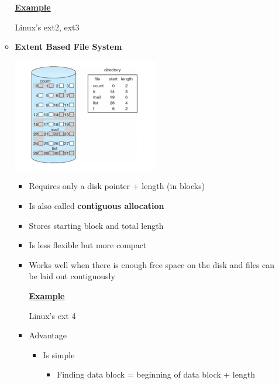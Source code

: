 \documentclass[12pt]{article}
\begin{document}
\begin{enumerate}[1.]
\begin{itemize}
        \bigskip

        \underline{\textbf{Example}}

        \bigskip

        Linux's ext2, ext3

        \item \textbf{Extent Based File System}

        \begin{center}
        \includegraphics[width=0.7\linewidth]{../images/midterm_4_solution_28.png}
        \end{center}

        \begin{itemize}
            \item Requires only a disk pointer + length (in blocks)
            \item Is also called \textbf{contiguous allocation}
            \item Stores starting block and total length
            \item Is less flexible but more compact
            \item Works well when there is enough free space on the disk and files can be laid out contiguously

            \bigskip

            \underline{\textbf{Example}}

            \bigskip

            Linux's ext 4

            \item Advantage

            \begin{itemize}
                \item Is simple

                \begin{itemize}
                    \item Finding data block = beginning of data block + length
                \end{itemize}
            \end{itemize}


\end{itemize}
\end{itemize}
\end{enumerate}
\end{document}
